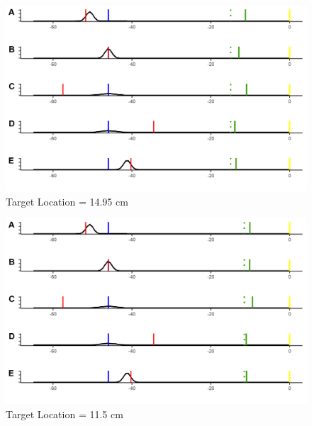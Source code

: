 \begin{figure}[h]
\centering       
    \includegraphics[width=\textwidth, keepaspectratio]{Images/bci-plots/bci_plot31-05.png}
    \caption{Target Location = 14.95 cm}
    \label{}
\end{figure}

\begin{figure}[h]
\centering       
    \includegraphics[width=\textwidth, keepaspectratio]{Images/bci-plots/bci_plot34-5.png}
    \caption{Target Location = 11.5 cm}
    \label{}
\end{figure}